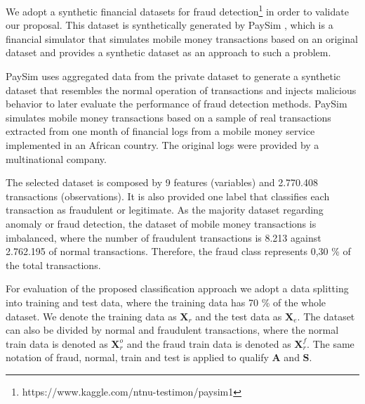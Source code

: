 We adopt a synthetic financial datasets for fraud detection\footnote{https://www.kaggle.com/ntnu-testimon/paysim1} in order to validate our proposal. This dataset is synthetically generated by  PaySim \cite{lopez2016paysim}, which is a financial simulator that simulates mobile money transactions based on an original dataset and provides a synthetic dataset as an approach to such a problem. 

PaySim uses aggregated data from the private dataset to generate a synthetic dataset that resembles the normal operation of transactions and injects malicious behavior to later evaluate the performance of fraud detection methods. PaySim simulates mobile money transactions based on a sample of real transactions extracted from one month of financial logs from a mobile money service implemented in an African country. The original logs were provided by a multinational company.

The selected dataset is composed by 9 features (variables) and 2.770.408 transactions (observations). It is also provided one label that classifies each transaction as fraudulent or legitimate. As the majority dataset regarding anomaly or fraud detection, the dataset of mobile money transactions is imbalanced, where the number of fraudulent transactions is 8.213 against 2.762.195 of normal transactions. Therefore, the fraud class represents 0,30 \% of the total transactions. 

For evaluation of the proposed classification approach we adopt a data splitting into training and test data, where the training data has 70 \% of the whole dataset. We denote the training data as $\textbf{X}_r$ and the test data as $\textbf{X}_e$. The dataset can also be divided by normal and fraudulent transactions, where the normal train data is denoted as $\textbf{X}_r^o$ and the fraud train data is denoted as $\textbf{X}_r^f$. The same notation of fraud, normal, train and test is applied to qualify $\textbf{A}$ and $\textbf{S}$.



